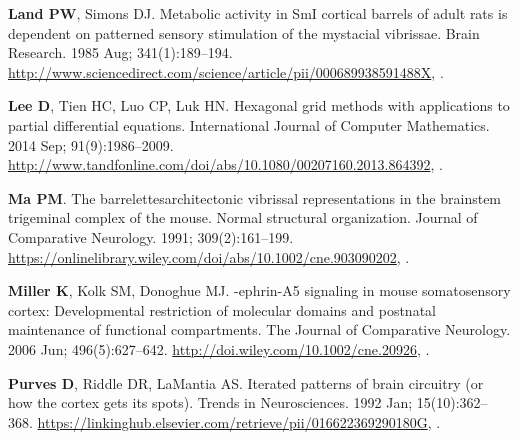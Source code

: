 \documentclass[9pt,lineno]{elife}
\begin{document}
\begin{thebibliography}{31}
\textbf{\color{eLifeMediumGrey} Land PW}, Simons DJ.
\newblock Metabolic activity in {SmI} cortical barrels of adult rats is
  dependent on patterned sensory stimulation of the mystacial vibrissae.
\newblock Brain Research.  1985 Aug; 341(1):189--194.
\newblock
  \urlprefix\url{http://www.sciencedirect.com/science/article/pii/000689938591488X},
  \href{10.1016/0006-8993(85)91488-X}{\doiprefix
  }.

\textbf{\color{eLifeMediumGrey} Lee D}, Tien HC, Luo CP, Luk HN.
\newblock Hexagonal grid methods with applications to partial differential
  equations.
\newblock International Journal of Computer Mathematics.  2014 Sep;
  91(9):1986--2009.
\newblock
  \urlprefix\url{http://www.tandfonline.com/doi/abs/10.1080/00207160.2013.864392},
  \href{10.1080/00207160.2013.864392}{\doiprefix
  }.

\textbf{\color{eLifeMediumGrey} Ma PM}.
\newblock The barrelettes{\textemdash}architectonic vibrissal representations
  in the brainstem trigeminal complex of the mouse. {Normal} structural
  organization.
\newblock Journal of Comparative Neurology.  1991; 309(2):161--199.
\newblock
  \urlprefix\url{https://onlinelibrary.wiley.com/doi/abs/10.1002/cne.903090202},
  \href{10.1002/cne.903090202}{\doiprefix {}}.

\textbf{\color{eLifeMediumGrey} Miller K}, Kolk SM, Donoghue MJ.
-ephrin-{A5} signaling in mouse somatosensory cortex:
  {Developmental} restriction of molecular domains and postnatal maintenance of
  functional compartments.
\newblock The Journal of Comparative Neurology.  2006 Jun; 496(5):627--642.
\newblock \urlprefix\url{http://doi.wiley.com/10.1002/cne.20926},
  \href{10.1002/cne.20926}{\doiprefix {}}.

\textbf{\color{eLifeMediumGrey} Purves D}, Riddle DR, LaMantia AS.
\newblock Iterated patterns of brain circuitry (or how the cortex gets its
  spots).
\newblock Trends in Neurosciences.  1992 Jan; 15(10):362--368.
\newblock
  \urlprefix\url{https://linkinghub.elsevier.com/retrieve/pii/016622369290180G},
  \href{10.1016/0166-2236(92)90180-G}{\doiprefix
  }.


\end{thebibliography}
\end{document}
